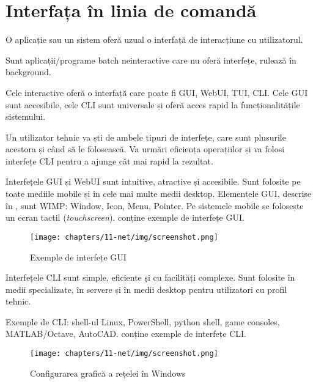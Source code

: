 \chapter{Interfața în linia de comandă}
\label{chapter:cli}

O aplicație sau un sistem oferă uzual o interfață de interacțiune cu
utilizatorul.

Sunt aplicații/programe batch neinteractive care nu oferă interfețe, rulează în
background.

Cele interactive oferă o interfață care poate fi GUI, WebUI, TUI, CLI. Cele GUI
sunt accesibile, cele CLI sunt universale și oferă acces rapid la
funcționalitățile sistemului.

Un utilizator tehnic va ști de ambele tipuri de interfețe, care sunt plusurile
acestora și când să le folosească. Va urmări eficiența operațiilor și va folosi
interfețe CLI pentru a ajunge cât mai rapid la rezultat.

Interfețele GUI și WebUI sunt intuitive, atractive și accesibile. Sunt folosite
pe toate mediile mobile și în cele mai multe medii desktop. Elementele GUI, descrise în , sunt WIMP: Window, Icon, Menu, Pointer. Pe sistemele mobile se folosește un ecran tactil (\textit{touchscreen}).  conține exemple de interfețe GUI.

\begin{figure}[!htbp]
  \centering
  \texttt{[image: chapters/11-net/img/screenshot.png]}
  \caption{Exemple de interfețe GUI}
  \label{fig:cli:gui}
\end{figure}

Interfețele CLI sunt simple, eficiente și cu facilități complexe. Sunt folosite
în medii specializate, în servere și în medii desktop pentru utilizatori cu
profil tehnic.

Exemple de CLI: shell-ul Linux, PowerShell, python shell, game consoles,
MATLAB/Octave, AutoCAD.  conține exemple de interfețe CLI.

\begin{figure}[!htbp]
  \centering
  \texttt{[image: chapters/11-net/img/screenshot.png]}
  \caption{Configurarea grafică a rețelei în Windows}
  \label{fig:net:windows-config}
\end{figure}

